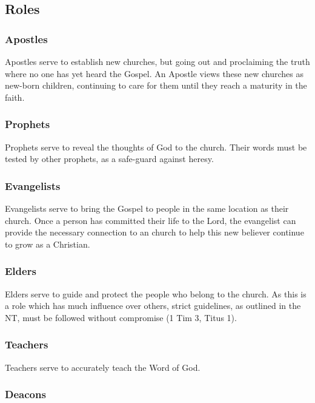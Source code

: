 \documentclass[CSHFoundation.tex]{subfiles}
\begin{document}
\subsection{Roles}

\subsubsection{Apostles}

Apostles serve to establish new churches, but going out and proclaiming the truth where no one has yet heard the Gospel. An Apostle views these new churches as new-born children, continuing to care for them until they reach a maturity in the faith.

\subsubsection{Prophets}

Prophets serve to reveal the thoughts of God to the church. Their words must be tested by other prophets, as a safe-guard against heresy.

\subsubsection{Evangelists}

Evangelists serve to bring the Gospel to people in the same location as their church. Once a person has committed their life to the Lord, the evangelist can provide the necessary connection to an church to help this new believer continue to grow as a Christian.

\subsubsection{Elders}

Elders serve to guide and protect the people who belong to the church. As this is a role which has much influence over others, strict guidelines, as outlined in the NT, must be followed without compromise (1 Tim 3, Titus 1).



\subsubsection{Teachers}

Teachers serve to accurately teach the Word of God.



\subsubsection{Deacons}
\end{document}
